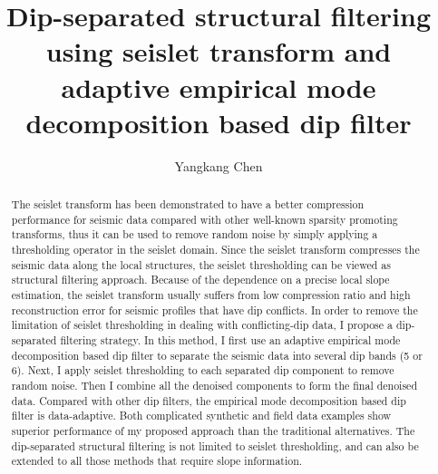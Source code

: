 

\title{Dip-separated structural filtering using seislet transform and adaptive empirical mode decomposition based dip filter}

\renewcommand{\thefootnote}{\fnsymbol{footnote}}
\author{Yangkang Chen}

\address{
\footnotemark[1]Bureau of Economic Geology \\
John A. and Katherine G. Jackson School of Geosciences \\
The University of Texas at Austin \\
University Station, Box X \\
Austin, TX 78713-8924 \\
ykchen@utexas.edu
}

\maketitle

\DeclareRobustCommand{\dlo}[1]{\ifthenelse{\boolean{@revd}}{}{}}
\DeclareRobustCommand{\wen}[1]{%
  \ifthenelse{\boolean{@revd}}{\textcolor{black}{#1}}{#1}}
  
\begin{abstract}
The seislet transform has been demonstrated to have a better compression performance for seismic data compared with other well-known sparsity promoting transforms, thus it can be used to remove random noise by simply applying a thresholding operator in the seislet domain. Since the seislet transform compresses the seismic data along the local structures, the seislet thresholding can be viewed as \dlo{the simplest}\wen{a simple} structural filtering approach. Because of the dependence on a precise local slope estimation, the seislet transform usually suffers from low compression ratio and high reconstruction error for seismic profiles that have dip conflicts. In order to remove the limitation of seislet thresholding in dealing with conflicting-dip data, I propose a \dlo{semi-automatic} dip-separated filtering strategy. In this method, I first use an adaptive empirical mode decomposition based dip filter to separate the seismic data into several dip bands (5 or 6). Next, I apply seislet thresholding to each separated dip component to remove random noise. Then I combine all the denoised components to form the final denoised data. Compared with other dip filters, the empirical mode decomposition based dip filter is data-adaptive. Both complicated synthetic and field data examples show superior performance of my proposed approach than the traditional alternatives. The dip-separated structural filtering is not limited to seislet thresholding, and can also be extended to all those methods that require slope information.
\end{abstract}

